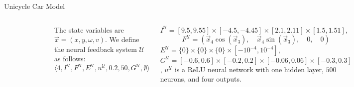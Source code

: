 \begin{frame}[fragile]{Unicycle Car Model}
\begin{columns}
    \begin{figure}
        \begin{center}
        \end{center}
    \end{figure}

    The state variables are $\vec{x} = (x, y, \omega, v)$. We define the neural feedback system $\mathcal{U}$ as follows:
    \[
        \langle 4, I^\mathcal{U}, F^\mathcal{U}, E^\mathcal{U}, u^\mathcal{U}, 0.2, 50, G^\mathcal{U}, \emptyset \rangle
    \]

    $I^\mathcal{U} = [9.5,9.55] \times [-4.5,-4.45] \times [2.1,2.11] \times [1.5,1.51]$, 
    \[
        F^\mathcal{U} = (\vec{x}_4 \cos(\vec{x}_3), \quad \vec{x}_4 \sin(\vec{x}_3), \quad 0, \quad 0)
    \]
    $E^\mathcal{U}=\{0\}\times\{0\}\times\{0\}\times [-10^{-4},10^{-4}]$, 
    $G^\mathcal{U} = [-0.6,0.6] \times [-0.2,0.2] \times [-0.06,0.06] \times [-0.3,0.3]$,
    $u^\mathcal{U}$ is a ReLU neural network with one hidden layer, $500$ neurons, and four outputs.

\end{columns}
\end{frame}
